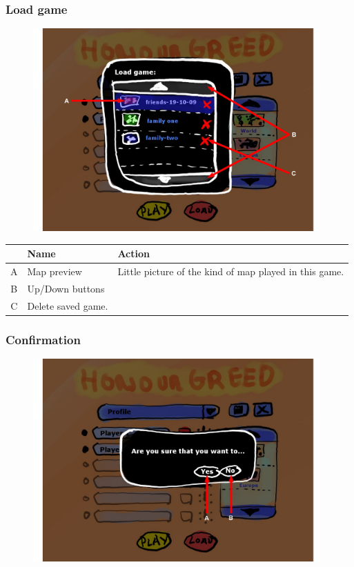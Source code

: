 \documentclass[12pt,a4paper]{article}
\begin{document}
\subsubsection{Load game}\label{mock:713}

\begin{figure}[H]
  \centering
  \includegraphics[width=11cm]{pic/mocks/1-3.pdf}
\end{figure}

\begin{table}[H]
\small
\centering
\begin{tabular}{c|p{5cm}|p{7cm}}
& Name & Action \\ \hline\hline
A
&Map preview
&Little picture of the kind of map played in this game.
\\B
&Up/Down buttons
\\C
&Delete saved game.

\end{tabular}
\end{table}

\subsubsection{Confirmation}\label{mock:714}
\begin{figure}[H]
  \centering
  \includegraphics[width=11cm]{pic/mocks/1-4.pdf}
\end{figure}
\end{document}
